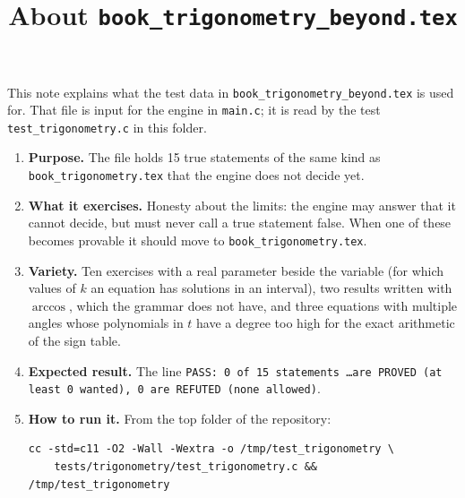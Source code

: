 \documentclass[11pt,a4paper]{article}
\title{About \texttt{book\_trigonometry\_beyond.tex}}
\author{}
\date{}
\begin{document}
\maketitle
This note explains what the test data in \texttt{book\_trigonometry\_beyond.tex} is used for. That file is input for the engine in \texttt{main.c}; it is read by the test \texttt{test\_trigonometry.c} in this folder.

\begin{enumerate}
\item \textbf{Purpose.} The file holds 15 true statements of the same kind as \texttt{book\_trigonometry.tex} that the engine does not decide yet.

\item \textbf{What it exercises.} Honesty about the limits: the engine may answer that it cannot decide, but must never call a true statement false. When one of these becomes provable it should move to \texttt{book\_trigonometry.tex}.

\item \textbf{Variety.} Ten exercises with a real parameter beside the variable (for which values of $k$ an equation has solutions in an interval), two results written with $\arccos$, which the grammar does not have, and three equations with multiple angles whose polynomials in $t$ have a degree too high for the exact arithmetic of the sign table.

\item \textbf{Expected result.} The line \texttt{PASS: 0 of 15 statements \ldots are PROVED (at least 0 wanted), 0 are REFUTED (none allowed)}.

\item \textbf{How to run it.} From the top folder of the repository:
\begin{verbatim}
cc -std=c11 -O2 -Wall -Wextra -o /tmp/test_trigonometry \
    tests/trigonometry/test_trigonometry.c && /tmp/test_trigonometry
\end{verbatim}
\end{enumerate}
\end{document}

